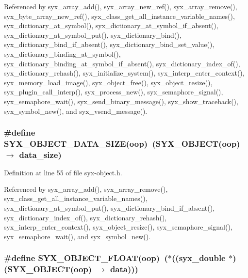 Referenced by syx\_\-array\_\-add(), syx\_\-array\_\-new\_\-ref(), syx\_\-array\_\-remove(), syx\_\-byte\_\-array\_\-new\_\-ref(), syx\_\-class\_\-get\_\-all\_\-instance\_\-variable\_\-names(), syx\_\-dictionary\_\-at\_\-symbol(), syx\_\-dictionary\_\-at\_\-symbol\_\-if\_\-absent(), syx\_\-dictionary\_\-at\_\-symbol\_\-put(), syx\_\-dictionary\_\-bind(), syx\_\-dictionary\_\-bind\_\-if\_\-absent(), syx\_\-dictionary\_\-bind\_\-set\_\-value(), syx\_\-dictionary\_\-binding\_\-at\_\-symbol(), syx\_\-dictionary\_\-binding\_\-at\_\-symbol\_\-if\_\-absent(), syx\_\-dictionary\_\-index\_\-of(), syx\_\-dictionary\_\-rehash(), syx\_\-initialize\_\-system(), syx\_\-interp\_\-enter\_\-context(), syx\_\-memory\_\-load\_\-image(), syx\_\-object\_\-free(), syx\_\-object\_\-resize(), syx\_\-plugin\_\-call\_\-interp(), syx\_\-process\_\-new(), syx\_\-semaphore\_\-signal(), syx\_\-semaphore\_\-wait(), syx\_\-send\_\-binary\_\-message(), syx\_\-show\_\-traceback(), syx\_\-symbol\_\-new(), and syx\_\-vsend\_\-message().\hypertarget{syx-object_8h_6739da61250709a86d303df2aa297758}{
\subsubsection{\setlength{\rightskip}{0pt plus 5cm}\#define SYX\_\-OBJECT\_\-DATA\_\-SIZE(oop)~(SYX\_\-OBJECT(oop) $\rightarrow$ data\_\-size)}}
\label{syx-object_8h_6739da61250709a86d303df2aa297758}




Definition at line 55 of file syx-object.h.

Referenced by syx\_\-array\_\-add(), syx\_\-array\_\-remove(), syx\_\-class\_\-get\_\-all\_\-instance\_\-variable\_\-names(), syx\_\-dictionary\_\-at\_\-symbol\_\-put(), syx\_\-dictionary\_\-bind\_\-if\_\-absent(), syx\_\-dictionary\_\-index\_\-of(), syx\_\-dictionary\_\-rehash(), syx\_\-interp\_\-enter\_\-context(), syx\_\-object\_\-resize(), syx\_\-semaphore\_\-signal(), syx\_\-semaphore\_\-wait(), and syx\_\-symbol\_\-new().\hypertarget{syx-object_8h_5421190920571a4e33c3dbf3b9ef61b1}{
\subsubsection{\setlength{\rightskip}{0pt plus 5cm}\#define SYX\_\-OBJECT\_\-FLOAT(oop)~($\ast$(({\bf syx\_\-double} $\ast$)(SYX\_\-OBJECT(oop) $\rightarrow$ data)))}}
\label{syx-object_8h_5421190920571a4e33c3dbf3b9ef61b1}




